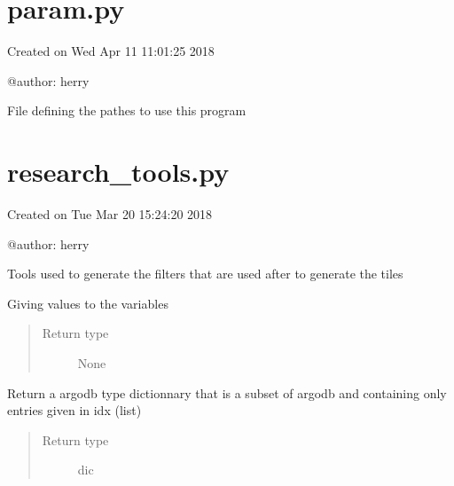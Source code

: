 \documentclass[letterpaper,10pt,english]{sphinxmanual}
\begin{document}
\section{param.py}
\label{\detokenize{pargopy:module-pargopy.param}}\label{\detokenize{pargopy:param-py}}
Created on Wed Apr 11 11:01:25 2018

@author: herry

File defining the pathes to use this program


\section{research\_tools.py}
\label{\detokenize{pargopy:module-pargopy.research_tools}}\label{\detokenize{pargopy:research-tools-py}}
Created on Tue Mar 20 15:24:20 2018

@author: herry

Tools used to generate the filters that are used after to generate the tiles

\begin{fulllineitems}
\label{\detokenize{pargopy:pargopy.research_tools.creating_tiles}}
Giving values to the variables
\begin{quote}\begin{description}
\item[{Return type}] \leavevmode
None

\end{description}\end{quote}

\end{fulllineitems}


\begin{fulllineitems}
\label{\detokenize{pargopy:pargopy.research_tools.extract_idx_from_argodb}}
Return a argodb type dictionnary that is a subset of argodb and
containing only entries given in idx (list)
\begin{quote}\begin{description}
\item[{Return type}] \leavevmode
dic

\end{description}\end{quote}

\end{fulllineitems}
\end{document}

